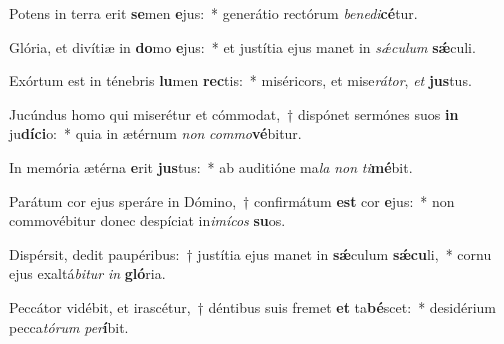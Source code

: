 \item Potens in terra erit \textbf{se}men \textbf{e}jus:~* generátio rectórum \textit{be}\textit{ne}\textit{di}\textbf{cé}tur.
\item Glória, et divítiæ in \textbf{do}mo \textbf{e}jus:~* et justítia ejus manet in \textit{sǽ}\textit{cu}\textit{lum} \textbf{sǽ}culi.
\item Exórtum est in ténebris \textbf{lu}men \textbf{rec}tis:~* miséricors, et mise\textit{rá}\textit{tor}, \textit{et} \textbf{jus}tus.
\item Jucúndus homo qui miserétur et cómmodat,~† dispónet sermónes suos \textbf{in} ju\textbf{dí}\textbf{ci}o:~* quia in ætérnum \textit{non} \textit{com}\textit{mo}\textbf{vé}bitur.
\item In memória ætérna \textbf{e}rit \textbf{jus}tus:~* ab auditióne ma\textit{la} \textit{non} \textit{ti}\textbf{mé}bit.
\item Parátum cor ejus speráre in Dómino,~† confirmátum \textbf{est} cor \textbf{e}jus:~* non commovébitur donec despíciat in\textit{i}\textit{mí}\textit{cos} \textbf{su}os.
\item Dispérsit, dedit paupéribus:~† justítia ejus manet in \textbf{sǽ}culum \textbf{sǽ}\textbf{cu}li,~* cornu ejus exaltá\textit{bi}\textit{tur} \textit{in} \textbf{gló}ria.
\item Peccátor vidébit, et irascétur,~† déntibus suis fremet \textbf{et} ta\textbf{bé}scet:~* desidérium pecca\textit{tó}\textit{rum} \textit{per}\textbf{í}bit.
